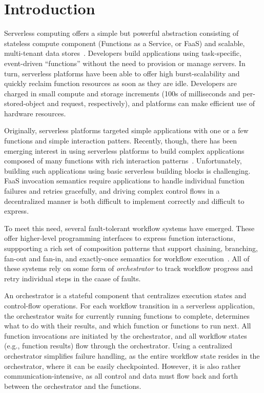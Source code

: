 \section{Introduction}

Serverless computing offers a simple but powerful abstraction consisting of
stateless compute component (Functions as a Service, or FaaS) and scalable,
multi-tenant data stores~\cite{berkeley}. Developers build applications using
task-specific, event-driven ``functions'' without the need to provision or
manage servers. In turn, serverless platforms have been able to offer high
burst-scalability and quickly reclaim function resources as soon as they are
idle. Developers are charged in small compute and storage increments (100s of
milliseconds and per-stored-object and request, respectively), and platforms
can make efficient use of hardware resources.

Originally, serverless platforms targeted simple applications with one or a few
functions and simple interaction patters. Recently, though, there has been
emerging interest in using serverless platforms to build complex applications
composed of many functions with rich interaction patterns~\cite{excamera,
pywren, gg-atc, beldi, boki}. Unfortunately, building such applications using
basic serverless building blocks is challenging. FaaS invocation semantics
require applications to handle individual function failures and retries
gracefully, and driving complex control flows in a decentralized manner is both
difficult to implement correctly and difficult to express.

To meet this need, several fault-tolerant workflow systems have emerged. These offer higher-level
programming interfaces to express function interactions, suppporting a rich set of
composition patterns that support chaining, branching, fan-out and fan-in, and
exactly-once semantics for workflow execution~\cite{excamera, gg-atc,
aws-step-functions, google-cloud-composer, google-workflows, durable-functions}.
All of these systems rely on some form of \emph{orchestrator} to track workflow progress
and retry individual steps in the caase of faults.

An orchestrator is a stateful component that centralizes execution states
and control-flow operations. For each workflow transition in a serverless
application, the orchestrator waits for currently running functions to complete,
determines what to do with their results, and which function or functions to run
next. All function invocations are initiated by the orchestrator, and all
workflow states (e.g., function results) flow through the orchestrator. Using a 
centralized orchestrator simplifies failure handling, as the entire workflow state resides
in the orchestrator, where it can be easily checkpointed. However, it is also rather
communication-intensive, as all control and data must flow back and forth between
the orchestrator and the functions.

